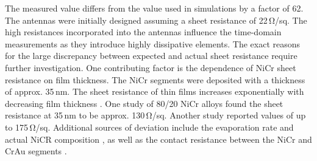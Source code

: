 The measured value differs from the value used in simulations by a factor of \num{62}. The antennas were initially designed assuming a sheet resistance of \num{22}\,\si{\ohm}/sq. The high resistances incorporated into the antennas influence the time-domain measurements as they introduce highly dissipative elements.  The exact reasons for the large discrepancy between expected and actual sheet resistance require further investigation. One contributing factor is the dependence of NiCr sheet resistance on film thickness. The NiCr segments were deposited with a thickness of approx. \num{35}\,\si{\nano \meter}. The sheet resistance of thin films increases exponentially with decreasing film thickness \cite{wittElectromechanicalPropertiesThin1974}. One study of \num{80}/\num{20} NiCr alloys found the sheet resistance at \num{35}\,\si{\nano \meter} to be approx. \num{130}\,\si{\ohm}/sq. Another study reported values of up to \num{175}\,\si{\ohm}/sq. Additional sources of deviation include the evaporation rate and actual NiCR composition \cite{rolkeNichromeThinFilm1981}, as well as the contact resistance between the NiCr and CrAu segments \cite{zhangAnalysisCurrentCrowding2015}. 

